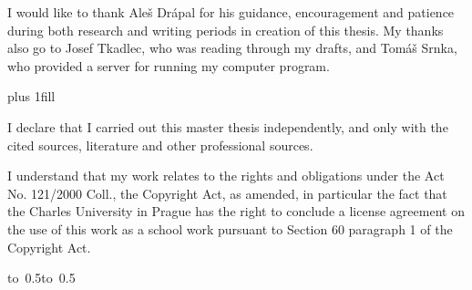 \documentclass[12pt,a4paper]{report}
\let\openright=\clearpage
\begin{document}
\newpage



\openright

\noindent
I would like to thank Aleš Drápal for his guidance, encouragement and patience during both research and writing periods in creation of this thesis. My thanks also go to Josef Tkadlec, who was reading through my drafts, and Tomáš Srnka, who provided a server for running my computer program.

\newpage


\vglue 0pt plus 1fill

\noindent
I declare that I carried out this master thesis independently, and only with the cited
sources, literature and other professional sources.

\medskip\noindent
I understand that my work relates to the rights and obligations under the Act No.
121/2000 Coll., the Copyright Act, as amended, in particular the fact that the Charles
University in Prague has the right to conclude a license agreement on the use of this
work as a school work pursuant to Section 60 paragraph 1 of the Copyright Act.

\vspace{10mm}

\hbox{\hbox to 0.5\hbox to 0.5}

\vspace{20mm}
\newpage

\end{document}
